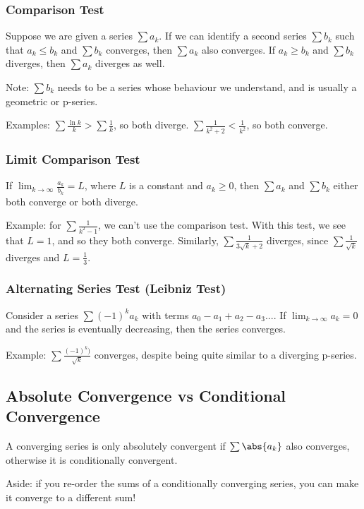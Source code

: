 \documentclass[12pt]{article}
\begin{document}
\subsubsection*{Comparison Test}
Suppose we are given a series $\sum a_k$. If we can identify a second series $\sum b_k$ such that $a_k \leq b_k$ and $\sum b_k$ converges, then $\sum a_k$ also converges. If $a_k \geq b_k$ and $\sum b_k$ diverges, then $\sum a_k$ diverges as well.

Note: $\sum b_k$ needs to be a series whose behaviour we understand, and is usually a geometric or p-series.

Examples: $\sum \frac{\ln k}{k} > \sum \frac{1}{k}$, so both diverge. $\sum \frac{1}{k^2 + 2} < \frac{1}{k^2}$, so both converge.

\subsubsection*{Limit Comparison Test}
If $\displaystyle\lim_{k\to\infty} \frac{a_k}{b_k} = L$, where $L$ is a constant and $a_k \geq 0$, then $\sum a_k$ and $\sum b_k$ either both converge or both diverge.

Example: for $\sum \frac{1}{k^2 - 1}$, we can't use the comparison test. With this test, we see that $L = 1$, and so they both converge. Similarly, $\sum \frac{1}{3\sqrt{k}+2}$ diverges, since $\sum \frac{1}{\sqrt{k}}$ diverges and $L = \frac{1}{3}$.

\subsubsection*{Alternating Series Test (Leibniz Test)}
Consider a series $\sum (-1)^k a_k$ with terms $a_0 - a_1 + a_2 - a_3 ...$. If $\displaystyle\lim_{k\to\infty} a_k = 0$ and the series is eventually decreasing, then the series converges.

Example: $\sum \frac{(-1)^k)}{\sqrt{k}}$ converges, despite being quite similar to a diverging p-series.

\subsection*{Absolute Convergence vs Conditional Convergence}
A converging series is only absolutely convergent if $\sum \abs{a_k}$ also converges, otherwise it is conditionally convergent.

Aside: if you re-order the sums of a conditionally converging series, you can make it converge to a different sum!
\end{document}
